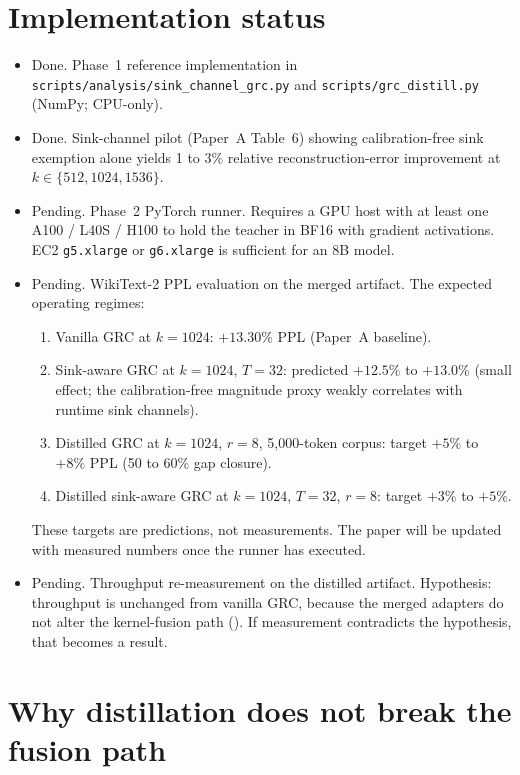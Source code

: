 \documentclass[11pt]{article}
\begin{document}
\section{Implementation status}
\label{sec:status}

\begin{itemize}
\item Done. Phase~1 reference implementation in
\texttt{scripts/analysis/sink\_channel\_grc.py} and
\texttt{scripts/grc\_distill.py} (NumPy; CPU-only).
\item Done. Sink-channel pilot (Paper~A Table~6) showing
calibration-free sink exemption alone yields 1 to 3\% relative
reconstruction-error improvement at $k\in\{512,1024,1536\}$.
\item Pending. Phase~2 PyTorch runner. Requires a GPU host
with at least one A100 / L40S / H100 to hold the teacher in BF16 with
gradient activations. EC2 \texttt{g5.xlarge} or \texttt{g6.xlarge} is
sufficient for an 8B model.
\item Pending. WikiText-2 PPL evaluation on the merged
artifact. The expected operating regimes:
\begin{enumerate}
  \item Vanilla GRC at $k{=}1024$: $+13.30\%$ PPL (Paper~A baseline).
  \item Sink-aware GRC at $k{=}1024$, $T{=}32$: predicted $+12.5\%$
        to $+13.0\%$ (small effect; the calibration-free magnitude proxy
        weakly correlates with runtime sink channels).
  \item Distilled GRC at $k{=}1024$, $r{=}8$, 5{,}000-token corpus:
        target $+5\%$ to $+8\%$ PPL (50 to 60\% gap closure).
  \item Distilled sink-aware GRC at $k{=}1024$, $T{=}32$, $r{=}8$:
        target $+3\%$ to $+5\%$.
\end{enumerate}
These targets are predictions, not measurements. The paper will be
updated with measured numbers once the runner has executed.
\item Pending. Throughput re-measurement on the distilled
artifact. Hypothesis: throughput is unchanged from vanilla GRC,
because the merged adapters do not alter the kernel-fusion path
(). If measurement contradicts the hypothesis,
that becomes a result.
\end{itemize}

\section{Why distillation does not break the fusion path}
\label{sec:fusion-fit}
\end{document}

